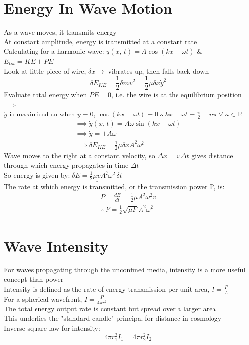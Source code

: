 \documentclass[a4paper, 11pt, fleqn, normalem]{report}
\begin{document}
\section{Energy In Wave Motion}
As a wave moves, it transmits energy \\
At constant amplitude, energy is transmitted at a constant rate \\
Calculating for a harmonic wave: $y(x,\,t) = A\cos{(kx - \omega t)}$ \& $E_{tot} = KE + PE$ \\
Look at little piece of wire, $\delta x \rightarrow$ vibrates up, then falls back down
\begin{equation*}
    \delta E_{KE} = \frac{1}{2}\delta mv^{2} = \frac{1}{2}\mu\delta x\dot{y}^{2}
\end{equation*}
Evaluate total energy when $PE = 0$, i.e. the wire is at the equilibrium position $\implies$ \\
$\dot{y}$ is maximised so when $y = 0$, $\cos{(kx - \omega t)} = 0 ~\therefore~ kx - \omega t = \frac{\pi}{2} + n\pi ~\forall~ n \in \mathbb{R}$
\begin{gather*}
    \implies \dot{y}(x,\,t) = A\omega\sin{(kx - \omega t)} \\
    \implies \dot{y} = \pm A\omega \\
    \implies \delta E_{KE} = \frac{1}{2}\mu\delta xA^{2}\omega^{2}
\end{gather*}
Wave moves to the right at a constant velocity, so $\Delta x = v \,\Delta t$ gives distance through which energy propagates in time $\Delta t$ \\
So energy is given by: $\underline{\delta E = \frac{1}{2}\mu vA^{2}\omega^{2}\,\delta t}$ \\
The rate at which energy is transmitted, or the transmission power P, is:
\begin{gather*}
    P = \frac{dE}{dt} = \frac{1}{2}\mu A^{2}\omega^{2}v \\
    \therefore ~\underline{P = \frac{1}{2}\sqrt{\mu F}A^{2}\omega^{2}}
\end{gather*}

\section{Wave Intensity}
For waves propagating through the unconfined media, intensity is a more useful concept than power \\
Intensity is defined as the rate of energy transmission per unit area, $I = \frac{P}{A}$ \\
For a spherical wavefront, $I = \frac{P}{4\pi r^{2}}$ \\
The total energy output rate is constant but spread over a larger area \\
This underlies the "standard candle" principal for distance in cosmology \\
Inverse square law for intensity:
\begin{equation*}
    4\pi r^{2}_{1}I_{1} = 4\pi r^{2}_{2}I_{2}
\end{equation*}
\end{document}
